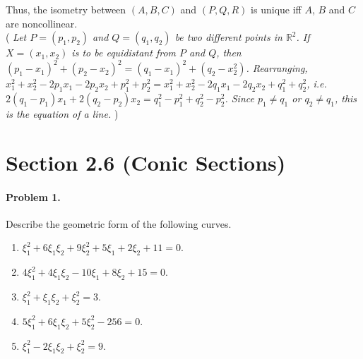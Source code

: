 \documentclass[10pt]{article}
\begin{document}
        Thus, the isometry between $(A, B, C)$ and $(P, Q, R)$ is unique iff $A$, $B$ and $C$ are noncollinear. \\

        (\textit{
        Let $P = (p_1, p_2)$ and $Q = (q_1, q_2)$ be two different points in $\mathbb{R}^2$. If $X = (x_1, x_2)$ is to be equidistant from
        $P$ and $Q$, then $(p_1 - x_1)^2 + (p_2 - x_2)^2 = (q_1 - x_1)^2 + (q_2 - x_2^2)$. Rearranging,
        $x_1^2 + x_2^2 - 2p_1x_1 - 2p_2x_2 + p_1^2 + p_2^2 = x_1^2 + x_2^2 - 2q_1x_1 - 2q_2x_2 + q_1^2 + q_2^2$,
        i.e.\ $2(q_1 - p_1)x_1 + 2(q_2 - p_2)x_2 = q_1^2 - p_1^2 + q_2^2 - p_2^2$. Since $p_1\neq q_1$ or $q_2 \neq q_1$, this is the 
        equation of a line.
        }) 
        

        \section*{Section 2.6 (Conic Sections)}
        \paragraph{Problem 1.} Describe the geometric form of the following curves.
        \begin{enumerate}
                \item $\xi_1^2 + 6\xi_1\xi_2 + 9\xi_2^2 + 5\xi_1 + 2\xi_2 + 11 = 0$.
                \item $4\xi_1^2 + 4\xi_1\xi_2 - 10\xi_1 + 8\xi_2 + 15 = 0$.
                \item $\xi_1^2 + \xi_1\xi_2 + \xi_2^2 = 3$.
                \item $5\xi_1^2 + 6\xi_1\xi_2 + 5\xi_2^2 - 256 = 0$.
                \item $\xi_1^2 - 2\xi_1\xi_2 + \xi_2^2 = 9$.
        \end{enumerate}
\end{document}
